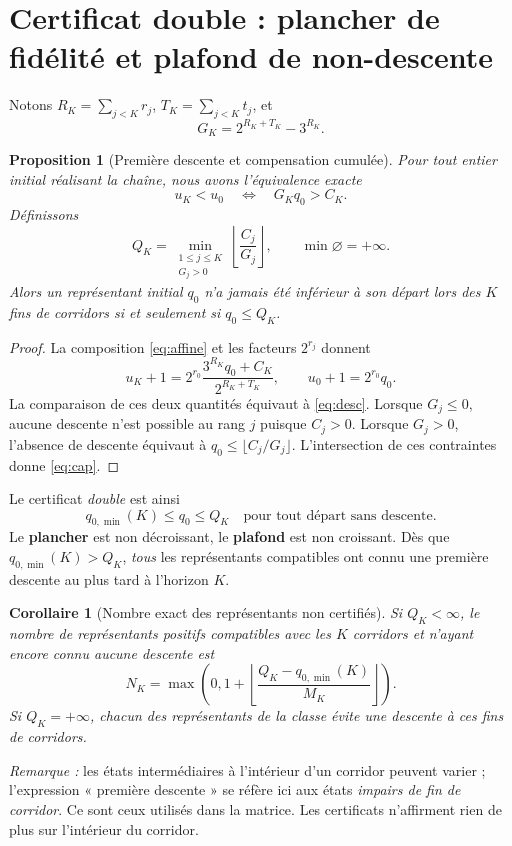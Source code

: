 \documentclass[11pt,a4paper]{article}
\newtheorem{proposition}[theoreme]{Proposition}
\newtheorem{corollaire}[theoreme]{Corollaire}
\begin{document}
\section{Certificat double : plancher de fidélité et plafond de non-descente}
Notons $R_K=\sum_{j<K}r_j$, $T_K=\sum_{j<K}t_j$, et
\[G_K=2^{R_K+T_K}-3^{R_K}.\]
\begin{proposition}[Première descente et compensation cumulée]\label{prop:duale}
Pour tout entier initial réalisant la chaîne, nous avons l'équivalence exacte
\begin{equation}\label{eq:desc}
\boxed{u_K<u_0\quad\Longleftrightarrow\quad G_Kq_0>C_K.}
\end{equation}
Définissons
\begin{equation}\label{eq:cap}
\boxed{Q_K=\min_{\substack{1\le j\le K\\G_j>0}}\left\lfloor\frac{C_j}{G_j}\right\rfloor,\qquad \min\varnothing=+\infty.}
\end{equation}
Alors un représentant initial $q_0$ n'a \emph{jamais} été inférieur à son départ lors des $K$ fins de corridors si et seulement si $q_0\le Q_K$.
\end{proposition}
\begin{proof}
La composition \eqref{eq:affine} et les facteurs $2^{r_j}$ donnent
\[u_K+1=2^{r_0}\frac{3^{R_K}q_0+C_K}{2^{R_K+T_K}},\qquad u_0+1=2^{r_0}q_0.\]
La comparaison de ces deux quantités équivaut à \eqref{eq:desc}. Lorsque $G_j\le0$, aucune descente n'est possible au rang $j$ puisque $C_j>0$. Lorsque $G_j>0$, l'absence de descente équivaut à $q_0\le\lfloor C_j/G_j\rfloor$. L'intersection de ces contraintes donne \eqref{eq:cap}.
\end{proof}
Le certificat \emph{double} est ainsi
\begin{equation}\label{eq:window}
\boxed{q_{0,\min}(K)\le q_0\le Q_K\quad\text{pour tout départ sans descente.}}
\end{equation}
Le \textbf{plancher} est non décroissant, le \textbf{plafond} est non croissant. Dès que $q_{0,\min}(K)>Q_K$, \emph{tous} les représentants compatibles ont connu une première descente au plus tard à l'horizon $K$.

\begin{corollaire}[Nombre exact des représentants non certifiés]
Si $Q_K<\infty$, le nombre de représentants positifs compatibles avec les $K$ corridors et n'ayant encore connu aucune descente est
\begin{equation}\label{eq:survivors}
\boxed{N_K=\max\left(0,1+\left\lfloor\frac{Q_K-q_{0,\min}(K)}{M_K}\right\rfloor\right).}
\end{equation}
Si $Q_K=+\infty$, chacun des représentants de la classe évite une descente à ces fins de corridors.
\end{corollaire}
\emph{Remarque :} les états intermédiaires à l'intérieur d'un corridor peuvent varier ; l'expression « première descente » se réfère ici aux états \emph{impairs de fin de corridor}. Ce sont ceux utilisés dans la matrice. Les certificats n'affirment rien de plus sur l'intérieur du corridor.
\end{document}
